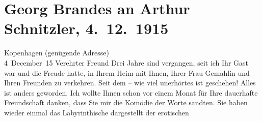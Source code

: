 

         
         \renewcommand{\erwaehntePersonen}{Personen: Johann Wolfgang von Goethe, Peter Nansen, Olga Schnitzler}
         \renewcommand{\erwaehnteOrte}{Orte: Dänemark, Kopenhagen, Wien}
         \renewcommand{\erwaehnteWerke}{Werke: Die Brüder Menthe, Komödie der Worte. Drei Einakter, Macbeth, Professor Bernhardi. Komödie in fünf Akten, Wolfgang Goethe}
               \section[Georg Brandes an Arthur Schnitzler, 4. 12. 1915]{ Georg Brandes an Arthur Schnitzler, 4. 12. 1915}\nopagebreak{}\rehead{ }\begin{ledgroupsized}[t]{13cm}\normalsize\beginnumbering \toendnotes[C]{\smallbreak\pagebreak[2]} 
\toendnotes[C]{\smallbreak}\pstart
           \raggedleft{}{\pb}Kopenhagen (genügende Adresse){\\}4 December 15\pend
           \pstart{}Verehrter Freund\pend\pstart
           Drei Jahre sind vergangen, seit ich Ihr Gast war und die Freude hatte, in Ihrem Heim
               mit Ihnen, Ihrer Frau Gemahlin und Ihren Freunden zu verkehren. Seit dem – wie viel unerhörtes ist
               geschehen! Alles ist anders geworden.\pend
           \pstart
           Ich wollte Ihnen schon vor einem Monat für Ihre dauerhafte Freundschaft danken, dass
               Sie mir die \uline{Komödie der Worte} sandten. Sie haben wieder einmal das Labyrinthische dargestellt der erotischen

\end{ledgroupsized}
